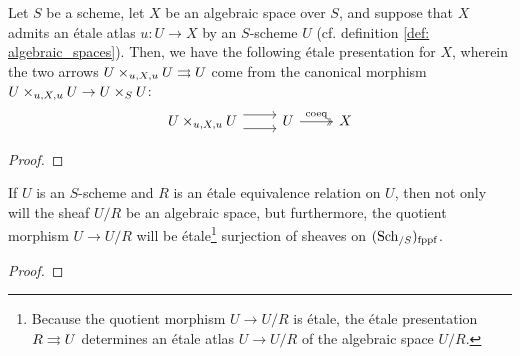             \begin{proposition} \label{prop: existence_of_etale_presentations_of_algebraic_spaces}
                Let $S$ be a scheme, let $X$ be an algebraic space over $S$, and suppose that $X$ admits an \'etale atlas $u: U \to X$ by an $S$-scheme $U$ (cf. definition \ref{def: algebraic_spaces}). Then, we have the following \'etale presentation for $X$, wherein the two arrows $U \x_{u, X, u} U \toto U$ come from the canonical morphism $U \x_{u, X, u} U \to U \x_S U$:
                    $$
                        \begin{tikzcd}
                        	{U \x_{u, X, u} U} & U & X
                        	\arrow[shift right=2, from=1-1, to=1-2]
                        	\arrow[shift left=2, from=1-1, to=1-2]
                        	\arrow["\coeq", two heads, from=1-2, to=1-3]
                        \end{tikzcd}
                    $$ 
            \end{proposition}
                \begin{proof}
                    
                \end{proof}
            \begin{proposition} \label{prop: quotients_of_schemes_by_etale_equivalence_relations_are_algebraic_spaces}
                If $U$ is an $S$-scheme and $R$ is an \'etale equivalence relation on $U$, then not only will the sheaf $U/R$ be an algebraic space, but furthermore, the quotient morphism $U \to U/R$ will be \'etale\footnote{Because the quotient morphism $U \to U/R$ is \'etale, the \'etale presentation $R \rightrightarrows U$ determines an \'etale atlas $U \to U/R$ of the algebraic space $U/R$.} surjection of sheaves on $(\mathrm{Sch}_{/S})_{\mathrm{fppf}}$. 
            \end{proposition}
                \begin{proof}
                    
                \end{proof}
                
            \begin{proposition} \label{prop: puhsouts_of_algebraic_spaces}
                
            \end{proposition}
    
